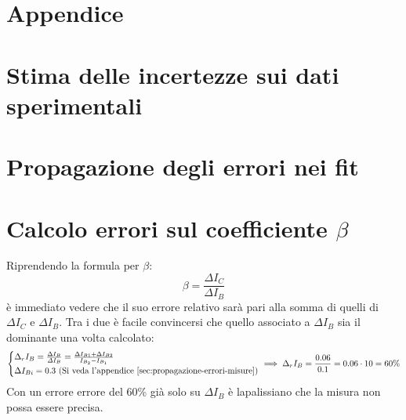 \documentclass[../main.tex]{subfiles}
\begin{document}
\section*{Appendice}

\section{Stima delle incertezze sui dati sperimentali}
  \label{sec:propagazione-errori-misure}


\section{Propagazione degli errori nei fit}
  \label{sec:propagazione-errori-log}


\section{Calcolo errori sul coefficiente $\beta$}
  \label{sec:errori-beta}
  Riprendendo la formula per $\beta$:
  \begin{equation*}
    \beta = \frac{\varDelta I_C}{\varDelta I_B}
  \end{equation*}
  è immediato vedere che il suo errore relativo sarà pari alla somma
  di quelli di $\varDelta I_C$ e $\varDelta I_B$.
  Tra i due è facile convincersi che quello associato a
  $\varDelta I_B$ sia il dominante una volta calcolato:
  \begin{equation*}
    \left\{
    \begin{array}{@{}l@{}}
      \Delta_r I_B = \frac{\Delta I_B}{\varDelta I_B} = \frac{\Delta I_{B1} + \Delta I_{B2}}{I_{B_2} - I_{B_1}} \\[1ex]
      \Delta I_{Bi} = 0.3 \text{ (Si veda l'appendice~\ref{sec:propagazione-errori-misure})}
    \end{array}\right. \implies
    \Delta_r I_B = \frac{0.06}{0.1} = 0.06 \cdot 10 = 60\%
  \end{equation*}
  Con un errore errore del 60\% già solo su $\varDelta I_B$ è
  lapalissiano che la misura non possa essere precisa.
\end{document}
